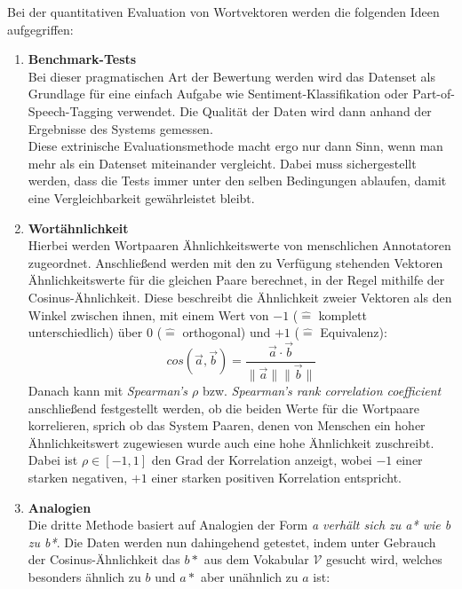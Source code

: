   Bei der quantitativen Evaluation von Wortvektoren werden die folgenden Ideen aufgegriffen:\\
  \begin{enumerate}
    \item \textbf{Benchmark-Tests}\\
      Bei dieser pragmatischen Art der Bewertung werden wird das Datenset als Grundlage für
      eine einfach Aufgabe wie Sentiment-Klassifikation oder Part-of-Speech-Tagging verwendet.
      Die Qualität der Daten wird dann anhand der Ergebnisse des Systems gemessen.\\
      Diese extrinische Evaluationsmethode macht ergo nur dann Sinn, wenn man mehr als ein Datenset
      miteinander vergleicht. Dabei muss sichergestellt werden, dass die Tests immer unter den
      selben Bedingungen ablaufen, damit eine Vergleichbarkeit gewährleistet bleibt.\\
    \item \textbf{Wortähnlichkeit}\\
      Hierbei werden Wortpaaren Ähnlichkeitswerte von menschlichen Annotatoren zugeordnet. Anschließend
      werden mit den zu Verfügung stehenden Vektoren Ähnlichkeitswerte für die gleichen Paare berechnet,
      in der Regel mithilfe der Cosinus-Ähnlichkeit. Diese beschreibt die Ähnlichkeit zweier Vektoren
      als den Winkel zwischen ihnen, mit einem Wert von $-1$ ($\hat{=}$ komplett unterschiedlich) über 0
      ($\hat{=}$ orthogonal) und $+1$ ($\hat{=}$ Equivalenz):
      \begin{equation}
        cos(\vec{a}, \vec{b}) = \frac{\vec{a} \cdot \vec{b}}{\|\vec{a}\| \|\vec{b}\|}
      \end{equation}
      Danach kann mit \emph{Spearman's $\rho$} bzw. \emph{Spearman's rank correlation coefficient}
      anschließend festgestellt werden, ob die beiden Werte für die Wortpaare korrelieren, sprich ob
      das System Paaren, denen von Menschen ein hoher Ähnlichkeitswert zugewiesen wurde auch eine hohe
      Ähnlichkeit zuschreibt. Dabei ist $\rho \in [-1, 1]$ den Grad der Korrelation anzeigt, wobei
      $-1$ einer starken negativen, $+1$ einer starken positiven Korrelation entspricht.
    \item \textbf{Analogien}\\
      Die dritte Methode basiert auf Analogien der Form \emph{a verhält sich zu a* wie b zu b*}.
      Die Daten werden nun dahingehend getestet, indem unter Gebrauch der Cosinus-Ähnlichkeit
      das $b*$ aus dem Vokabular $\mathcal{V}$ gesucht wird, welches besonders ähnlich zu $b$ und $a*$ aber unähnlich zu $a$ ist:

\end{enumerate}
